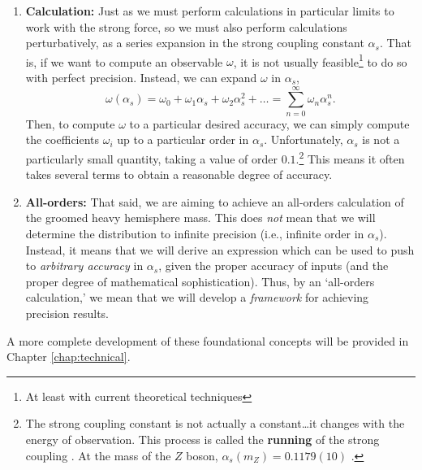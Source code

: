 \documentclass[../thesis.tex]{subfiles}
\begin{document}
\begin{enumerate}
		\item \textbf{Calculation:} Just as we must perform calculations in particular limits to work with the strong force, so we must also perform calculations perturbatively, as a series expansion in the strong coupling constant $\alpha_s$. That is, if we want to compute an observable $\omega$, it is not usually feasible\footnote{At least with current theoretical techniques} to do so with perfect precision. Instead, we can expand $\omega$ in $\alpha_s$,
		\begin{equation}
			\omega(\alpha_s) = \omega_0 + \omega_1 \alpha_s + \omega_2 \alpha_s^2 + \dots = \sum_{n = 0}^\infty \omega_n \alpha_s^n.
		\end{equation}
		Then, to compute $\omega$ to a particular desired accuracy, we can simply compute the coefficients $\omega_i$ up to a particular order in $\alpha_s$. Unfortunately, $\alpha_s$ is not a particularly small quantity, taking a value of order $0.1$.\footnote{The strong coupling constant is not actually a constant\dots it changes with the energy of observation. This process is called the \textbf{running} of the strong coupling \cite{larkoski_elementary_2019-1}. At the mass of the $Z$ boson, $\alpha_s(m_Z) = 0.1179(10)$ \cite{particle_data_group_review_2020}.} This means it often takes several terms to obtain a reasonable degree of accuracy.

		\item \textbf{All-orders:} That said, we are aiming to achieve an all-orders calculation of the groomed heavy hemisphere mass. This does \textit{not} mean that we will determine the distribution to infinite precision (i.e., infinite order in $\alpha_s$). Instead, it means that we will derive an expression which can be used to push to \textit{arbitrary accuracy} in $\alpha_s$, given the proper accuracy of inputs (and the proper degree of mathematical sophistication). Thus, by an `all-orders calculation,' we mean that we will develop a \textit{framework} for achieving precision results.
	\end{enumerate}
	A more complete development of these foundational concepts will be provided in Chapter \ref{chap:technical}.
\end{document}
